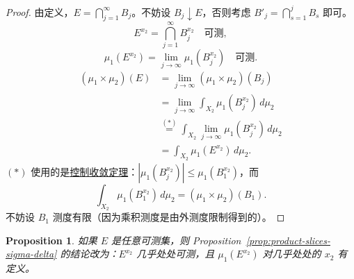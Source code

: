 \documentclass[12pt,letterpaper,twoside,openright]{ctexbook}
\theoremstyle{bluehead}
\newtheorem{proposition}[theorem]{Proposition}
\theoremstyle{olivehead}
\theoremstyle{orangehead}
\theoremstyle{redremark}
\begin{document}
\begin{proof}
由定义，$E=\bigcap_{j=1}^{\infty}B_j$。不妨设 $B_j\downarrow E$，否则考虑 $B'_j=\bigcap_{s=1}^{j}B_s$ 即可。
\[
  E^{x_2}=\bigcap_{j=1}^{\infty}B_j^{x_2}\quad\text{可测},
\]
\[
  \mu_1(E^{x_2})=\lim_{j\to\infty}\mu_1(B_j^{x_2})\quad\text{可测}.
\]
\[
\begin{aligned}
  (\mu_1\times\mu_2)(E)
  &=\lim_{j\to\infty}(\mu_1\times\mu_2)(B_j)\\
  &=\lim_{j\to\infty}\int_{X_2}\mu_1(B_j^{x_2})\,d\mu_2\\
  &\overset{(*)}{=}\int_{X_2}\lim_{j\to\infty}\mu_1(B_j^{x_2})\,d\mu_2\\
  &=\int_{X_2}\mu_1(E^{x_2})\,d\mu_2.
\end{aligned}
\]
$(*)$ 使用的是\hyperref[thm:dominated-convergence]{控制收敛定理}：$|\mu_1(B_j^{x_2})|\leq\mu_1(B_1^{x_2})$，而
\[
  \int_{X_2}\mu_1(B_1^{x_2})\,d\mu_2=(\mu_1\times\mu_2)(B_1).
\]
不妨设 $B_1$ 测度有限（因为乘积测度是由外测度限制得到的）。
\end{proof}
\begin{proposition}
如果 $E$ 是任意可测集，则 Proposition~\ref{prop:product-slices-sigma-delta} 的结论改为：$E^{x_2}$ 几乎处处可测，且 $\mu_1(E^{x_2})$ 对几乎处处的 $x_2$ 有定义。
\end{proposition}
\end{document}
